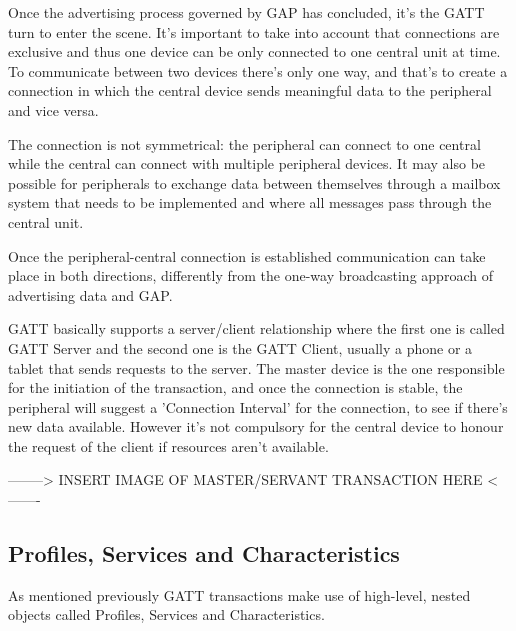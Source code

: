 Once the advertising process governed by GAP has concluded, it's the GATT turn to enter the scene.
It's important to take into account that connections are exclusive and thus one device can be only connected to one central unit at time.
To communicate between two devices there's only one way, and that's to create a connection in which the central device sends meaningful data to the peripheral and vice versa.

The connection is not symmetrical: the peripheral can connect to one central while the central can connect with multiple peripheral devices.
It may also be possible for peripherals to exchange data between themselves through a mailbox system that needs to be implemented and where all messages pass through the central unit.

Once the peripheral-central connection is established communication can take place in both directions, differently from the one-way broadcasting approach of advertising data and GAP.

GATT basically supports a server/client relationship where the first one is called GATT Server and the second one is the GATT Client, usually a phone or a tablet that sends requests to the server.
The master device is the one responsible for the initiation of the transaction, and once the connection is stable, the peripheral will suggest a 'Connection Interval' for the connection, to see if there's new data available. However it's not compulsory for the central device to honour the request of the client if resources aren't available.


--------> INSERT IMAGE OF MASTER/SERVANT TRANSACTION HERE <-------

\subsection{Profiles, Services and Characteristics}

As mentioned previously GATT transactions make use of high-level, nested objects called Profiles, Services and Characteristics.

